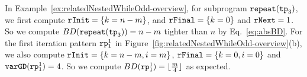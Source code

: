 In Example~\ref{ex:relatedNestedWhileOdd-overview}, for subprogram $\mathtt{repeat}(\mathtt{tp}_3)$, we first compute $\mathtt{rInit} = \{k = n - m\}$,
and $\mathtt{rFinal} = \{k = 0\}$ and $\mathtt{rNext} = 1$. So we compute $BD(\mathtt{repeat}(\mathtt{tp}_3)) = n - m$ tighter than $n$ by Eq.~\ref{eq:absBD}.
For the first iteration pattern $\mathtt{rp}_1^1$ in Figure~\ref{fig:relatedNestedWhileOdd-overview}(b), we also compute 
$\mathtt{rInit} = \{k = n - m, i = m\}$, $\mathtt{rFinal} = \{k = 0, i = 0\}$ and $\mathtt{varGD}(\mathtt{rp}_1^1) = 4$. So we compute $BD(\mathtt{rp}_1^1) = \lfloor \frac{m}{4} \rfloor $ as expected.

